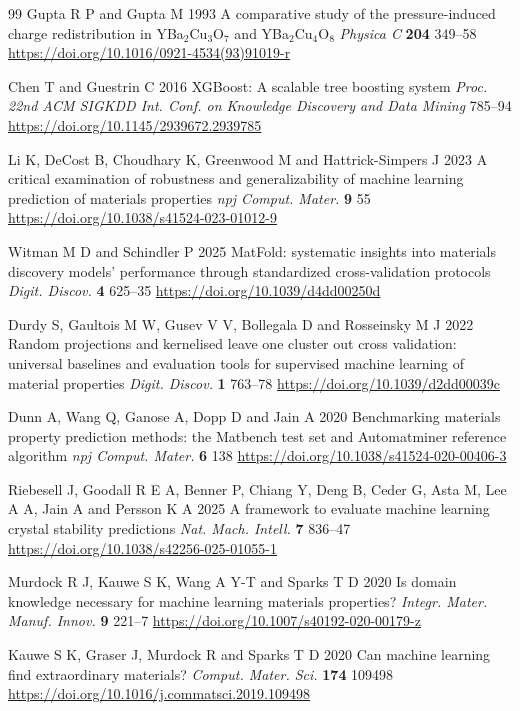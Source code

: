\documentclass{iopjournal}
\begin{document}
{\begin{thebibliography}{99}
Gupta R P and Gupta M 1993 A comparative study of the pressure-induced charge redistribution in YBa$_{2}$Cu$_{3}$O$_{7}$ and YBa$_{2}$Cu$_{4}$O$_{8}$
\textit{Physica C} \textbf{204} 349--58
\url{https://doi.org/10.1016/0921-4534(93)91019-r}

Chen T and Guestrin C 2016 XGBoost: A scalable tree boosting system
\textit{Proc. 22nd ACM SIGKDD Int. Conf. on Knowledge Discovery and Data Mining} 785--94
\url{https://doi.org/10.1145/2939672.2939785}

Li K, DeCost B, Choudhary K, Greenwood M and Hattrick-Simpers J 2023 A critical examination of
robustness and generalizability of machine learning prediction of materials properties
\textit{npj Comput. Mater.} \textbf{9} 55
\url{https://doi.org/10.1038/s41524-023-01012-9}

Witman M D and Schindler P 2025 MatFold: systematic insights into materials discovery models'
performance through standardized cross-validation protocols \textit{Digit. Discov.} \textbf{4} 625--35
\url{https://doi.org/10.1039/d4dd00250d}

Durdy S, Gaultois M W, Gusev V V, Bollegala D and Rosseinsky M J 2022 Random projections and
kernelised leave one cluster out cross validation: universal baselines and evaluation tools for
supervised machine learning of material properties \textit{Digit. Discov.} \textbf{1} 763--78
\url{https://doi.org/10.1039/d2dd00039c}

Dunn A, Wang Q, Ganose A, Dopp D and Jain A 2020 Benchmarking materials property prediction
methods: the Matbench test set and Automatminer reference algorithm
\textit{npj Comput. Mater.} \textbf{6} 138
\url{https://doi.org/10.1038/s41524-020-00406-3}

Riebesell J, Goodall R E A, Benner P, Chiang Y, Deng B, Ceder G, Asta M, Lee A A, Jain A and
Persson K A 2025 A framework to evaluate machine learning crystal stability predictions
\textit{Nat. Mach. Intell.} \textbf{7} 836--47
\url{https://doi.org/10.1038/s42256-025-01055-1}

Murdock R J, Kauwe S K, Wang A Y-T and Sparks T D 2020 Is domain knowledge necessary for machine
learning materials properties? \textit{Integr. Mater. Manuf. Innov.} \textbf{9} 221--7
\url{https://doi.org/10.1007/s40192-020-00179-z}

Kauwe S K, Graser J, Murdock R and Sparks T D 2020 Can machine learning find extraordinary
materials? \textit{Comput. Mater. Sci.} \textbf{174} 109498
\url{https://doi.org/10.1016/j.commatsci.2019.109498}

\end{thebibliography}}
\end{document}
